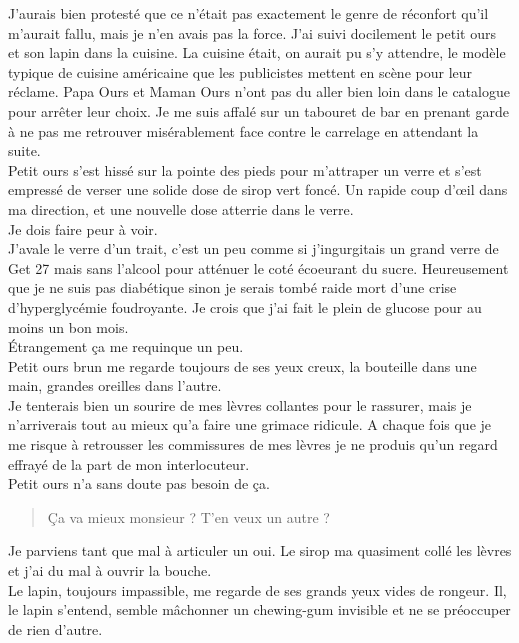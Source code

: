 J'aurais bien protesté que ce n'était pas exactement le genre de réconfort qu'il m'aurait fallu, mais je n'en avais pas la force. J'ai suivi docilement le petit ours et son lapin dans la cuisine. La cuisine était, on aurait pu s'y attendre, le modèle typique de cuisine américaine que les publicistes mettent en scène pour leur réclame. Papa Ours et Maman Ours n'ont pas du aller bien loin dans le catalogue pour arrêter leur choix. Je me suis affalé sur un tabouret de bar en prenant garde à ne pas me retrouver misérablement face contre le carrelage en attendant la suite. \\
Petit ours s'est hissé sur la pointe des pieds pour m'attraper un verre et s'est empressé de verser une solide dose de sirop vert foncé. Un rapide coup d’œil dans ma direction, et une nouvelle dose atterrie dans le verre. \\
Je dois faire peur à voir. \\

J’avale le verre d'un trait, c'est un peu comme si j'ingurgitais un grand verre de Get 27 mais sans l'alcool pour atténuer le coté écoeurant du sucre. Heureusement que je ne suis pas diabétique sinon je serais tombé raide mort d'une crise d'hyperglycémie foudroyante. Je crois que j'ai fait le plein de glucose pour au moins un bon mois. \\
Étrangement ça me requinque un peu.\\
Petit ours brun me regarde toujours de ses yeux creux, la bouteille dans une main, grandes oreilles dans l'autre. \\
Je tenterais bien un sourire de mes lèvres collantes pour le rassurer, mais je n'arriverais tout au mieux qu'a faire une grimace ridicule. A chaque fois que je me risque à retrousser les commissures de mes lèvres je ne produis qu'un regard effrayé de la part de mon interlocuteur. \\
Petit ours n'a sans doute pas besoin de ça. \\

\begin{quote}
Ça va mieux monsieur ? T'en veux un autre ?
\end{quote}

Je parviens tant que mal à articuler un oui. Le sirop ma quasiment collé les lèvres et j'ai du mal à ouvrir la bouche. \\

Le lapin, toujours impassible, me regarde de ses grands yeux vides de rongeur. Il, le lapin s'entend, semble mâchonner un chewing-gum invisible et ne se préoccuper de rien d'autre. \\

